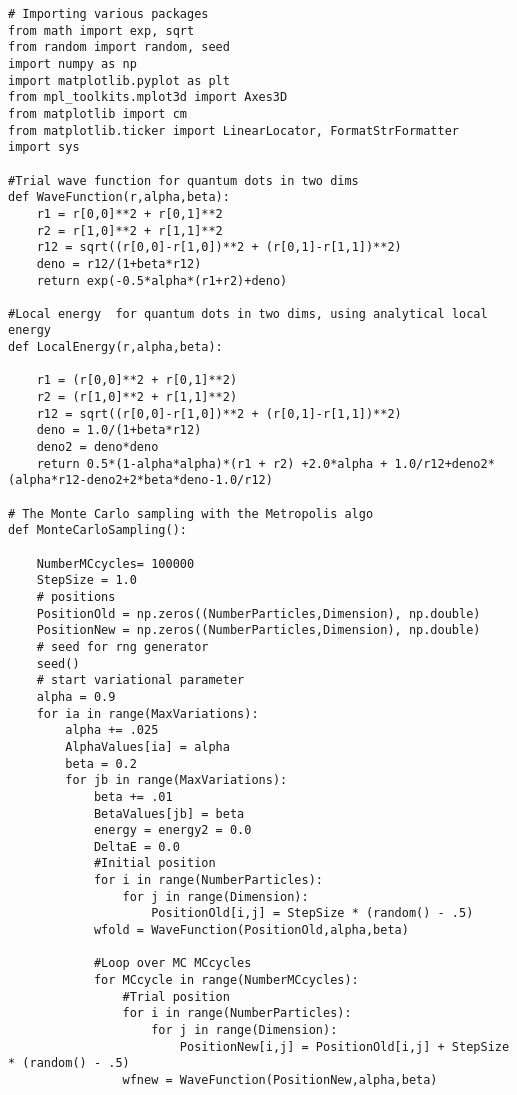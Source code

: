 \begin{verbatim}
# Importing various packages
from math import exp, sqrt
from random import random, seed
import numpy as np
import matplotlib.pyplot as plt
from mpl_toolkits.mplot3d import Axes3D
from matplotlib import cm
from matplotlib.ticker import LinearLocator, FormatStrFormatter
import sys

#Trial wave function for quantum dots in two dims
def WaveFunction(r,alpha,beta):
    r1 = r[0,0]**2 + r[0,1]**2
    r2 = r[1,0]**2 + r[1,1]**2
    r12 = sqrt((r[0,0]-r[1,0])**2 + (r[0,1]-r[1,1])**2)
    deno = r12/(1+beta*r12)
    return exp(-0.5*alpha*(r1+r2)+deno)

#Local energy  for quantum dots in two dims, using analytical local energy
def LocalEnergy(r,alpha,beta):
    
    r1 = (r[0,0]**2 + r[0,1]**2)
    r2 = (r[1,0]**2 + r[1,1]**2)
    r12 = sqrt((r[0,0]-r[1,0])**2 + (r[0,1]-r[1,1])**2)
    deno = 1.0/(1+beta*r12)
    deno2 = deno*deno
    return 0.5*(1-alpha*alpha)*(r1 + r2) +2.0*alpha + 1.0/r12+deno2*(alpha*r12-deno2+2*beta*deno-1.0/r12)

# The Monte Carlo sampling with the Metropolis algo
def MonteCarloSampling():

    NumberMCcycles= 100000
    StepSize = 1.0
    # positions
    PositionOld = np.zeros((NumberParticles,Dimension), np.double)
    PositionNew = np.zeros((NumberParticles,Dimension), np.double)
    # seed for rng generator
    seed()
    # start variational parameter
    alpha = 0.9
    for ia in range(MaxVariations):
        alpha += .025
        AlphaValues[ia] = alpha
        beta = 0.2 
        for jb in range(MaxVariations):
            beta += .01
            BetaValues[jb] = beta
            energy = energy2 = 0.0
            DeltaE = 0.0
            #Initial position
            for i in range(NumberParticles):
                for j in range(Dimension):
                    PositionOld[i,j] = StepSize * (random() - .5)
            wfold = WaveFunction(PositionOld,alpha,beta)

            #Loop over MC MCcycles
            for MCcycle in range(NumberMCcycles):
                #Trial position
                for i in range(NumberParticles):
                    for j in range(Dimension):
                        PositionNew[i,j] = PositionOld[i,j] + StepSize * (random() - .5)
                wfnew = WaveFunction(PositionNew,alpha,beta)


\end{verbatim}
